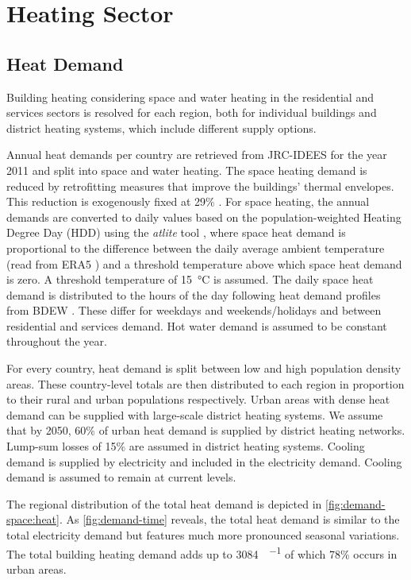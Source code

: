 \section{Heating Sector}
\label{sec:si:heat}

\subsection{Heat Demand}
\label{sec:si:heat:demand}

Building heating considering space and water heating in the residential and
services sectors is resolved for each region, both for individual buildings and
district heating systems, which include different supply options.

Annual heat demands per country are retrieved from JRC-IDEES  for
the year 2011 and split into space and water heating. The space heating demand
is reduced by retrofitting measures that improve the buildings' thermal
envelopes. This reduction is exogenously fixed at 29\%
. For space
heating, the annual demands are converted to daily values based on the
population-weighted Heating Degree Day (HDD) using the \textit{atlite} tool
, where space heat demand is proportional to the difference between the
daily average ambient temperature (read from ERA5 ) and a threshold
temperature above which space heat demand is zero. A threshold temperature of
\SI{15}{\celsius} is assumed. The daily space heat demand is distributed to the
hours of the day following heat demand profiles from BDEW . These differ
for weekdays and weekends/holidays and between residential and services demand.
Hot water demand is assumed to be constant throughout the year.

For every country, heat demand is split between low and high population density
areas. These country-level totals are then distributed to each region in
proportion to their rural and urban populations respectively. Urban areas with
dense heat demand can be supplied with large-scale district heating systems. We
assume that by 2050, 60\% of urban heat demand is supplied by district heating
networks. Lump-sum losses of 15\% are assumed in district heating systems.
Cooling demand is supplied by electricity and included in the electricity
demand. Cooling demand is assumed to remain at current levels.

The regional distribution of the total heat demand is depicted in
\cref{fig:demand-space:heat}. As \cref{fig:demand-time} reveals, the total heat
demand is similar to the total electricity demand but features much more
pronounced seasonal variations. The total building heating demand adds up to
\SI{3084}{\twh\per\year} of which 78\% occurs in urban areas.

